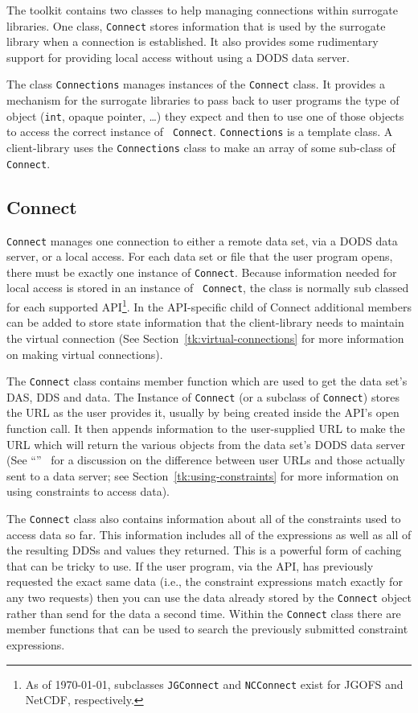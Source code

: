 The toolkit contains two classes to help managing connections within
surrogate libraries. One class, {\tt Connect} stores information that is used
by the surrogate library when a connection is established. It also provides
some rudimentary support for providing local access without using a DODS data
server.

The class {\tt Connections} manages instances of the {\tt Connect} class. It
provides a mechanism for the surrogate libraries to pass back to user
programs the type of object ({\tt int}, opaque pointer, \ldots) they expect
and then to use one of those objects to access the correct instance of {\tt
  Connect}. {\tt Connections} is a template class. A client-library uses the
{\tt Connections} class to make an array of some sub-class of {\tt Connect}.

\subsection{Connect}

{\tt Connect} manages one connection to either a remote data set, via a DODS
data server, or a local access. For each data set or file that the user
program opens, there must be exactly one instance of {\tt Connect}. Because
information needed for local access is stored in an instance of {\tt
  Connect}, the class is normally sub classed for each supported
API\footnote{As of \today, subclasses {\tt JGConnect} and {\tt NCConnect}
  exist for JGOFS and NetCDF, respectively.}. In the API-specific child of
{\rm Connect\/} additional members can be added to store state information
that the client-library needs to maintain the virtual connection (See
Section~\ref{tk:virtual-connections} for more information on making virtual
connections).

The {\tt Connect} class contains member function which are used to get the
data set's DAS, DDS and data. The Instance of {\tt Connect} (or a subclass of
{\tt Connect}) stores the URL as the user provides it, usually by being
created inside the API's open function call. It then appends information to
the user-supplied URL to make the URL which will return the various objects
from the data set's DODS data server (See
``\URL''~ for a discussion on the
difference between user URLs and those actually sent to a data server; see
Section~\ref{tk:using-constraints} for more information on using constraints
to access data).

The {\tt Connect} class also contains information about all of the
constraints used to access data so far. This information includes all of the
expressions as well as all of the resulting DDSs and values they returned.
This is a powerful form of caching that can be tricky to use. If the user
program, via the API, has previously requested the exact same data (i.e., the
constraint expressions match exactly for any two requests) then you can use
the data already stored by the {\tt Connect} object rather than send for the
data a second time. Within the {\tt Connect} class there are member functions
that can be used to search the previously submitted constraint expressions.

